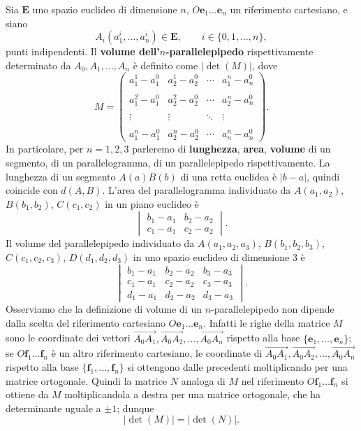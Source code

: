 \documentclass{article}
\theoremstyle{plain}
\theoremstyle{definition}
\theoremstyle{remark}
\begin{document}
\vspace{10pt}

Sia $\mathbf{E}$ uno spazio euclideo di dimensione $n$, $O \mathbf{e}_1 \ldots \mathbf{e}_n$ un riferimento cartesiano, e 
siano 
\[A_i(a_1^i, \ldots, a_n^i)\in\mathbf{E},\quad\quad i\in\{0,1,\ldots,n\}, \]
punti indipendenti. Il \textbf{volume dell'$n$-parallelepipedo} rispettivamente determinato da 
$A_0, A_1, \ldots, A_n$ è definito come $|\det(M)|$, dove
\[M = \begin{pmatrix}
a_1^1 - a_1^0 & a_2^1 - a_2^0 & \cdots & a_1^n - a_n^0 \\\\
a_1^2 - a_1^0 & a_2^2 - a_2^0 & \cdots & a_2^n - a_n^0 \\\\
\vdots & \vdots & \ddots & \vdots \\\\
a_1^n - a_1^0 & a_2^n - a_2^0 & \cdots & a_n^n - a_n^0
\end{pmatrix}.\]
In particolare, per $n = 1, 2, 3$ parleremo di \textbf{lunghezza}, \textbf{area}, \textbf{volume} di un segmento, 
di un parallelogramma, di un parallelepipedo rispettivamente. La lunghezza di un segmento $A(a)B(b)$ di una 
retta euclidea è $|b - a|$, quindi coincide con $d(A, B)$.
L'area del parallelogramma individuato da $A(a_1, a_2)$, $B(b_1, b_2)$, $C(c_1, c_2)$ in un piano euclideo è
\[\begin{vmatrix}
b_1 - a_1 & b_2 - a_2 \\
c_1 - a_1 & c_2 - a_2
\end{vmatrix}.\]
Il volume del parallelepipedo individuato da 
$A(a_1, a_2, a_3)$, $B(b_1, b_2, b_3)$, $C(c_1, c_2, c_3)$, $D(d_1, d_2, d_3)$ in uno spazio euclideo di 
dimensione $3$ è
\[\begin{vmatrix}
b_1 - a_1 & b_2 - a_2 & b_3 - a_3 \\
c_1 - a_1 & c_2 - a_2 & c_3 - a_3 \\
d_1 - a_1 & d_2 - a_2 & d_3 - a_3
\end{vmatrix}.\]
Osserviamo che la definizione di volume di un $n$-parallelepipedo non dipende dalla scelta del riferimento 
cartesiano $O\mathbf{e}_1 \ldots \mathbf{e}_n$. Infatti le righe della matrice $M$ sono le coordinate dei 
vettori $\overrightarrow{A_0A_1},\overrightarrow{A_0A_2},\ldots,\overrightarrow{A_0A_n}$ rispetto 
alla base $\{\mathbf{e}_1, \ldots, \mathbf{e}_n\}$; se $O\mathbf{f}_1 \ldots \mathbf{f}_n$ è un altro 
riferimento cartesiano, le coordinate di 
$\overrightarrow{A_0A_1},\overrightarrow{A_0A_2},\ldots,\overrightarrow{A_0A_n}$ 
rispetto alla base $\{\mathbf{f}_1, \ldots, \mathbf{f}_n\}$ si ottengono dalle 
precedenti moltiplicando per una matrice ortogonale. Quindi la matrice $N$ analoga di $M$ nel riferimento 
$O\mathbf{f}_1 \ldots \mathbf{f}_n$ si ottiene da $M$ moltiplicandola a destra per una matrice ortogonale, 
che ha determinante uguale a $\pm 1$; dunque
\[|\det(M)| = |\det(N)|.\]
\end{document}
